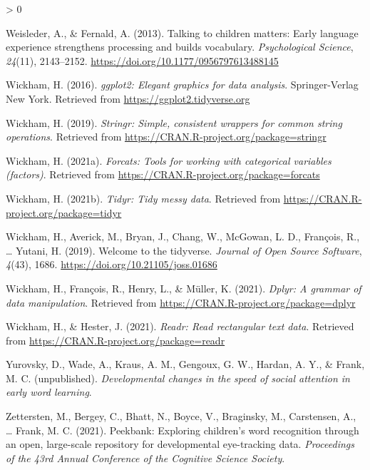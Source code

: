 \documentclass[
  english,
  man,floatsintext]{apa6}
\newlength{\cslhangindent}
\newenvironment{CSLReferences}[2] %
 {%
  \setlength{\parindent}{0pt}
  \ifodd #1 \everypar{\setlength{\hangindent}{\cslhangindent}}\ignorespaces\fi
  \ifnum #2 > 0
  \setlength{\parskip}{#2\baselineskip}
  \fi
 }%
 {}
\begin{document}
\begin{CSLReferences}{1}{0}
\leavevmode\hypertarget{ref-Weisleder2013}{}%
Weisleder, A., \& Fernald, A. (2013). {Talking to children matters: Early language experience strengthens processing and builds vocabulary}. \emph{Psychological Science}, \emph{24}(11), 2143--2152. \url{https://doi.org/10.1177/0956797613488145}

\leavevmode\hypertarget{ref-R-ggplot2}{}%
Wickham, H. (2016). \emph{ggplot2: Elegant graphics for data analysis}. Springer-Verlag New York. Retrieved from \url{https://ggplot2.tidyverse.org}

\leavevmode\hypertarget{ref-R-stringr}{}%
Wickham, H. (2019). \emph{Stringr: Simple, consistent wrappers for common string operations}. Retrieved from \url{https://CRAN.R-project.org/package=stringr}

\leavevmode\hypertarget{ref-R-forcats}{}%
Wickham, H. (2021a). \emph{Forcats: Tools for working with categorical variables (factors)}. Retrieved from \url{https://CRAN.R-project.org/package=forcats}

\leavevmode\hypertarget{ref-R-tidyr}{}%
Wickham, H. (2021b). \emph{Tidyr: Tidy messy data}. Retrieved from \url{https://CRAN.R-project.org/package=tidyr}

\leavevmode\hypertarget{ref-R-tidyverse}{}%
Wickham, H., Averick, M., Bryan, J., Chang, W., McGowan, L. D., François, R., \ldots{} Yutani, H. (2019). Welcome to the {tidyverse}. \emph{Journal of Open Source Software}, \emph{4}(43), 1686. \url{https://doi.org/10.21105/joss.01686}

\leavevmode\hypertarget{ref-R-dplyr}{}%
Wickham, H., François, R., Henry, L., \& Müller, K. (2021). \emph{Dplyr: A grammar of data manipulation}. Retrieved from \url{https://CRAN.R-project.org/package=dplyr}

\leavevmode\hypertarget{ref-R-readr}{}%
Wickham, H., \& Hester, J. (2021). \emph{Readr: Read rectangular text data}. Retrieved from \url{https://CRAN.R-project.org/package=readr}

\leavevmode\hypertarget{ref-YurovskyWadeKrausUnpub}{}%
Yurovsky, D., Wade, A., Kraus, A. M., Gengoux, G. W., Hardan, A. Y., \& Frank, M. C. (unpublished). \emph{{Developmental changes in the speed of social attention in early word learning}}.

\leavevmode\hypertarget{ref-zettersten2021}{}%
Zettersten, M., Bergey, C., Bhatt, N., Boyce, V., Braginsky, M., Carstensen, A., \ldots{} Frank, M. C. (2021). Peekbank: Exploring children's word recognition through an open, large-scale repository for developmental eye-tracking data. \emph{Proceedings of the 43rd Annual Conference of the Cognitive Science Society}.

\end{CSLReferences}

\endgroup
\end{document}
